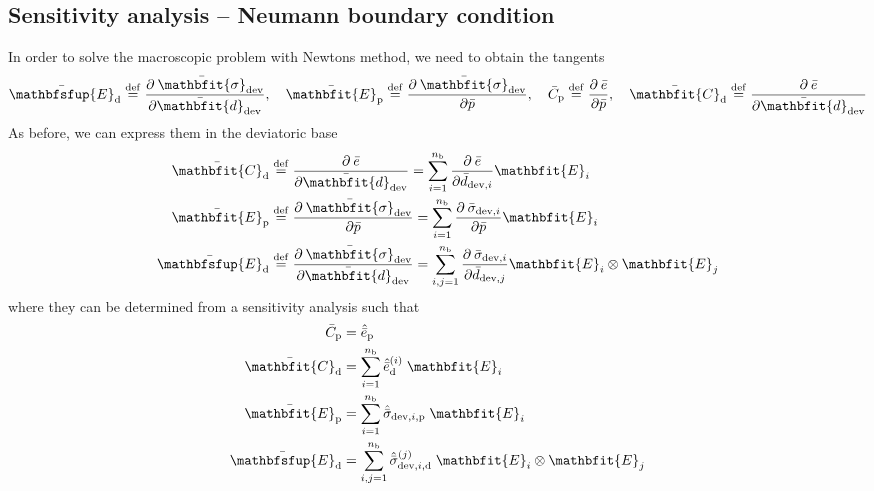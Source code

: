 \documentclass[12pt,a4paper,fleqn]{article}
\renewcommand{\ts}[1]{\mathbfit{#1}}
\renewcommand{\tf}[1]{\mathbfsfup{#1}}
\newcommand{\ded}{\mathrm{d}}
\newcommand{\dep}{\mathrm{p}}
\begin{document}
\subsection{Sensitivity analysis -- Neumann boundary condition}
In order to solve the macroscopic problem with Newtons method, we need to obtain the tangents
\begin{align}\label{eq:macro_tangents}
 \bar{\tf E}_\ded \defeq \pd{\bar{\ts\sigma}_\dev}{\bar{\ts d}_\dev}, \quad
 \bar{\ts E}_\dep \defeq \pd{\bar{\ts\sigma}_\dev}{\bar{p}}, \quad
 \bar{    C}_\dep \defeq \pd{\bar{e}}{\bar{p}}, \quad
 \bar{\ts C}_\ded \defeq \pd{\bar{e}}{\bar{\ts d}_\dev}
\end{align}
As before, we can express them in the deviatoric base
\begin{align}
 \bar{\ts C}_\ded \defeq \;&\pd{\bar{e}}{\bar{\ts d}_\dev} = \sum_{i=1}^{n_\mathrm{b}} \pd{\bar{e}}{\bar{d}_{\dev,i}} \ts E_i\\
 \bar{\ts E}_\dep \defeq \;&\pd{\bar{\ts\sigma}_\dev}{\bar{p}} = \sum_{i=1}^{n_\mathrm{b}} \pd{\bar{\sigma}_{\dev,i}}{\bar{p}} \ts E_i\\
 \bar{\tf E}_\ded \defeq \;&\pd{\bar{\ts\sigma}_\dev}{\bar{\ts d}_\dev} =  \sum_{i,j=1}^{n_\mathrm{b}} \pd{\bar{\sigma}_{\dev,i}}{\bar{d}_{\dev,j}} \ts E_i \outerp \ts E_j
\end{align}
where they can be determined from a sensitivity analysis such that
\begin{align}
 \bar{    C}_\dep &= \hat{\bar{e}}_{\dep}\\
 \bar{\ts C}_\ded &= \sum_{i=1}^{n_\mathrm{b}} \hat{\bar{e}}_{\ded}^{(i)}\;\ts E_i\\
 \bar{\ts E}_\dep &= \sum_{i=1}^{n_\mathrm{b}} \hat{\bar{\sigma}}_{\dev,i,\dep}\;\ts E_i\\
 \bar{\tf E}_\ded &= \sum_{i,j=1}^{n_\mathrm{b}} \hat{\bar{\sigma}}_{\dev,i,\ded}^{(j)}\;\ts E_i \outerp \ts E_j
\end{align}
\end{document}
